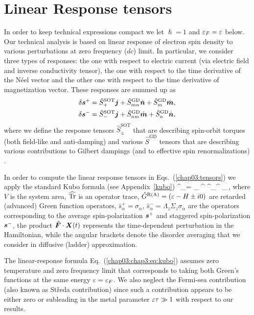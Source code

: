 \section{Linear Response tensors}\label{chap03:sec:appb}
\label{chap03:app:vertexcorrections}
In order to keep technical expressions compact we let $\hslash=1$ and $\varepsilon_F=\varepsilon$ below. Our technical analysis is based on linear response of electron spin density to various perturbations at zero frequency ($dc$) limit. In particular, we consider three types of responses: the one with respect to electric current (via electric field and inverse conductivity tensor), the one with respect to the time derivative of the N\'eel vector 
and the other one with respect to the time derivative of magnetization vector. These responses are summed up as
\beml
\label{chap03:tensors}
\begin{align}
\delta\boldsymbol{s}^+=\hat{S}^\textrm{SOT}_+\boldsymbol{j} +\hat{S}^\textrm{GD}_{mn} \dot{\boldsymbol{n}}+\hat{S}^\textrm{GD}_m\dot{\boldsymbol{m}},\\
\delta\boldsymbol{s}^-=\hat{S}^\textrm{SOT}_-\boldsymbol{j}+\hat{S}^\textrm{GD}_{nm}\dot{\boldsymbol{m}}+\hat{S}^\textrm{GD}_n \dot{\boldsymbol{n}},
\end{align}
\eml
where we define the response tensors $\hat{S}^\textrm{SOT}_\pm$ that are describing spin-orbit torques (both field-like and anti-damping) and various $\hat{S}^\textrm{GD}$ tensors that are describing various contributions to Gilbert dampings (and to effective spin renormalizations) \cite{ado_anisotropy_2019}.

In order to compute the linear response tensors in Eqs.~(\ref{chap03:tensors}) we apply the standard Kubo formula (see Appendix~\ref{kubo})
\be
\label{chap03:chap3:eq:kubo}
\delta{}^\pm_\alpha = 
\s_\beta \widehat{\tr}  \lt\la {}^ ^\pm_\alpha {}^  
_\beta \rt\ra \,,
\e
where $V$ is the system area, $\widehat{\operatorname{Tr}}$ is an operator trace, $\hat{G}^\text{R(A)}=(\varepsilon-H\pm i 0)$ are retarded (advanced) Green function operators, $\hat{s}_\alpha^+ = \sigma_\alpha$, $\hat{s}_\alpha^-=\Lambda_z\Sigma_z\sigma_\alpha$ are the operators corresponding to the average spin-polarization $\boldsymbol{s}^+$ and staggered spin-polarization $\boldsymbol{s}^-$, the product $\hat{\boldsymbol{F}}\cdot \boldsymbol{X}(t)$ represents the time-dependent perturbation in the Hamiltonian, while the angular brackets denote the disorder averaging that we consider in diffusive (ladder) approximation.

The linear-response formula Eq.~(\ref{chap03:chap3:eq:kubo}) assumes zero temperature and zero frequency limit that corresponds to taking both Green's functions at the same energy $\varepsilon=\varepsilon_F$. We also neglect the Fermi-sea contribution (also known as St\v{r}eda contribution) since such a contribution appears to be either zero or subleading in the metal parameter $\varepsilon\tau\gg 1$ with respect to our results.  
 
